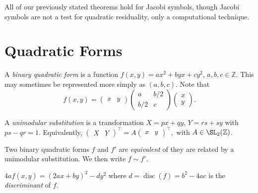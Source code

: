 \documentclass[a4paper, 10pt]{amsart}
\begin{document}
\begin{remark}
    All of our previously stated theorems hold for Jacobi symbols, though Jacobi symbols are not a test for quadratic residuality, only a computational technique. 
\end{remark}

\section{Quadratic Forms}

\begin{definition}
    A \emph{binary quadratic form} is a function $f(x, y) = ax^2 + byx + cy^2$, $a, b, c \in \mathbb{Z}$. This may sometimes be represented more simply as $(a, b, c)$. Note that
    $$
    f(x, y) = 
    \begin{pmatrix}
        x & y
    \end{pmatrix}
    \begin{pmatrix}
        a & b/2 \\ b/2 & c
    \end{pmatrix} 
    \begin{pmatrix}
        x \\ y
    \end{pmatrix}.
    $$
\end{definition}

\begin{definition}
    A \emph{unimodular substitution} is a transformation $X = px + qy$, $Y = rs + sy$ with $ps - qr = 1$. Equivalently, $\begin{pmatrix}
        X & Y
    \end{pmatrix}^\intercal = A \begin{pmatrix}
        x & y
    \end{pmatrix}^\intercal,$ with $A \in \SL_2(\mathbb{Z})$.
\end{definition}

\begin{definition}
    Two binary quadratic forms $f$ and $f'$ are \emph{equivalent} of they are related by a unimodular substitution. We then write $f \sim f'$.
\end{definition}

\begin{definition}
    $4a f(x, y) = (2ax + by)^2 - dy^2$ where $d = \operatorname{disc}(f) = b^2 - 4ac$ is the \emph{discriminant} of $f$.
\end{definition}
\end{document}
